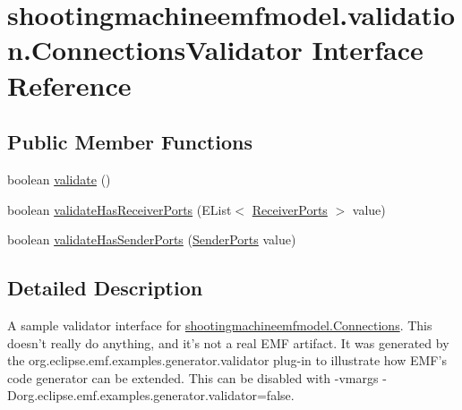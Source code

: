 \hypertarget{interfaceshootingmachineemfmodel_1_1validation_1_1_connections_validator}{\section{shootingmachineemfmodel.\-validation.\-Connections\-Validator Interface Reference}
\label{interfaceshootingmachineemfmodel_1_1validation_1_1_connections_validator}
}
\subsection*{Public Member Functions}
\begin{DoxyCompactItemize}
\item 
boolean \hyperlink{interfaceshootingmachineemfmodel_1_1validation_1_1_connections_validator_af2cbc8812790516ed9608c7718ad8c27}{validate} ()
\item 
boolean \hyperlink{interfaceshootingmachineemfmodel_1_1validation_1_1_connections_validator_aff7a8eb699ca6a1b94903c9c89842a2b}{validate\-Has\-Receiver\-Ports} (E\-List$<$ \hyperlink{interfaceshootingmachineemfmodel_1_1_receiver_ports}{Receiver\-Ports} $>$ value)
\item 
boolean \hyperlink{interfaceshootingmachineemfmodel_1_1validation_1_1_connections_validator_acd0eb0847cad0c9e04fc8c60147884ab}{validate\-Has\-Sender\-Ports} (\hyperlink{interfaceshootingmachineemfmodel_1_1_sender_ports}{Sender\-Ports} value)
\end{DoxyCompactItemize}


\subsection{Detailed Description}
A sample validator interface for \hyperlink{interfaceshootingmachineemfmodel_1_1_connections}{shootingmachineemfmodel.\-Connections}. This doesn't really do anything, and it's not a real E\-M\-F artifact. It was generated by the org.\-eclipse.\-emf.\-examples.\-generator.\-validator plug-\/in to illustrate how E\-M\-F's code generator can be extended. This can be disabled with -\/vmargs -\/\-Dorg.\-eclipse.\-emf.\-examples.\-generator.\-validator=false. 


